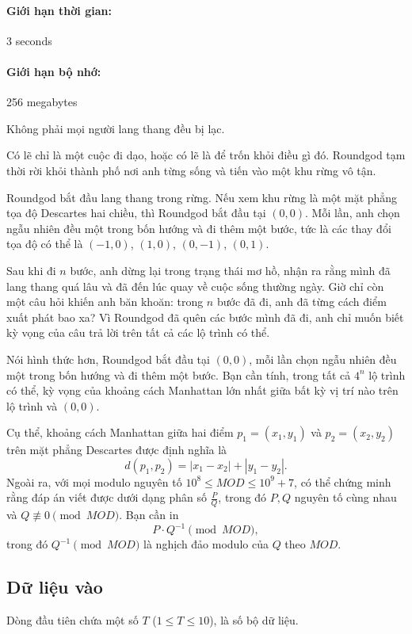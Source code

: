 \documentclass[11pt]{article}
\begin{document}
\paragraph{Giới hạn thời gian:} 3 seconds
\paragraph{Giới hạn bộ nhớ:} 256 megabytes

Không phải mọi người lang thang đều bị lạc.

Có lẽ chỉ là một cuộc đi dạo, hoặc có lẽ là để trốn khỏi điều gì đó. Roundgod
tạm thời rời khỏi thành phố nơi anh từng sống và tiến vào một khu rừng vô
tận.

Roundgod bắt đầu lang thang trong rừng. Nếu xem khu rừng là một mặt phẳng
tọa độ Descartes hai chiều, thì Roundgod bắt đầu tại \((0,0)\). Mỗi lần, anh
chọn ngẫu nhiên đều một trong bốn hướng và đi thêm một bước, tức là các thay
đổi tọa độ có thể là \((-1,0)\), \((1,0)\), \((0,-1)\), \((0,1)\).

Sau khi đi \(n\) bước, anh dừng lại trong trạng thái mơ hồ, nhận ra rằng mình
đã lang thang quá lâu và đã đến lúc quay về cuộc sống thường ngày. Giờ chỉ
còn một câu hỏi khiến anh băn khoăn: trong \(n\) bước đã đi, anh đã từng cách
điểm xuất phát bao xa? Vì Roundgod đã quên các bước mình đã đi, anh chỉ muốn
biết kỳ vọng của câu trả lời trên tất cả các lộ trình có thể.

Nói hình thức hơn, Roundgod bắt đầu tại \((0,0)\), mỗi lần chọn ngẫu nhiên đều
một trong bốn hướng và đi thêm một bước. Bạn cần tính, trong tất cả \(4^n\) lộ
trình có thể, kỳ vọng của khoảng cách Manhattan lớn nhất giữa bất kỳ vị trí
nào trên lộ trình và \((0,0)\).

Cụ thể, khoảng cách Manhattan giữa hai điểm \(p_1=(x_1,y_1)\) và
\(p_2=(x_2,y_2)\) trên mặt phẳng Descartes được định nghĩa là
\[
  d(p_1,p_2)=|x_1-x_2|+|y_1-y_2|.
\]
Ngoài ra, với mọi modulo nguyên tố \(10^8\le MOD\le 10^9+7\), có thể chứng
minh rằng đáp án viết được dưới dạng phân số \(\frac{P}{Q}\), trong đó
\(P,Q\) nguyên tố cùng nhau và \(Q\not\equiv 0\pmod {MOD}\). Bạn cần in
\[
  P\cdot Q^{-1}\pmod {MOD},
\]
trong đó \(Q^{-1}\pmod {MOD}\) là nghịch đảo modulo của \(Q\) theo \(MOD\).

\subsection*{Dữ liệu vào}

Dòng đầu tiên chứa một số \(T\) (\(1\le T\le 10\)), là số bộ dữ liệu.
\end{document}

